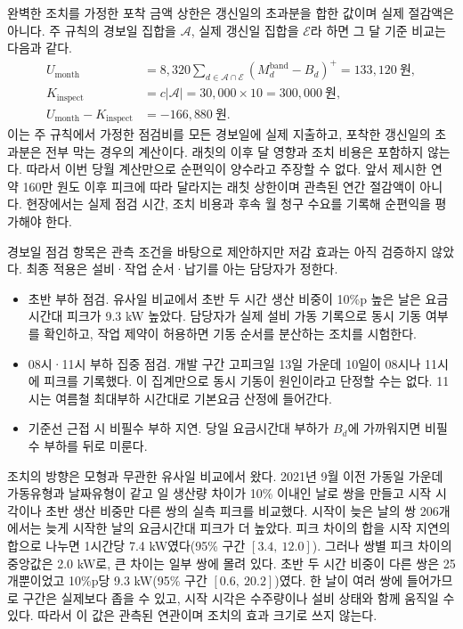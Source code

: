 완벽한 조치를 가정한 포착 금액 상한은 갱신일의 초과분을 합한 값이며 실제 절감액은 아니다. 주 규칙의 경보일 집합을 $\mathcal A$, 실제 갱신일 집합을 $\mathcal E$라 하면 그 달 기준 비교는 다음과 같다.
\begin{align}
U_{\mathrm{month}} &= 8{,}320\sum_{d\in\mathcal A\cap\mathcal E}
(M_d^{\mathrm{band}}-B_d)^+=133{,}120\ \text{원},\\
K_{\mathrm{inspect}} &= c|\mathcal A|=30{,}000\times10=300{,}000\ \text{원},\\
U_{\mathrm{month}}-K_{\mathrm{inspect}} &= -166{,}880\ \text{원}.
\label{eq:ch5-month-net-cap}
\end{align}
이는 주 규칙에서 가정한 점검비를 모든 경보일에 실제 지출하고, 포착한 갱신일의 초과분은 전부 막는 경우의 계산이다. 래칫의 이후 달 영향과 조치 비용은 포함하지 않는다. 따라서 이번 당월 계산만으로 순편익이 양수라고 주장할 수 없다. 앞서 제시한 연 약 160만 원도 이후 피크에 따라 달라지는 래칫 상한이며 관측된 연간 절감액이 아니다. 현장에서는 실제 점검 시간, 조치 비용과 후속 월 청구 수요를 기록해 순편익을 평가해야 한다.

경보일 점검 항목은 관측 조건을 바탕으로 제안하지만 저감 효과는 아직 검증하지 않았다. 최종 적용은 설비·작업 순서·납기를 아는 담당자가 정한다.
\begin{itemize}
\item 초반 부하 점검. 유사일 비교에서 초반 두 시간 생산 비중이 10\%p 높은 날은 요금시간대 피크가 9.3 kW 높았다. 담당자가 실제 설비 가동 기록으로 동시 기동 여부를 확인하고, 작업 제약이 허용하면 기동 순서를 분산하는 조치를 시험한다.
\item 08시·11시 부하 집중 점검. 개발 구간 고피크일 13일 가운데 10일이 08시나 11시에 피크를 기록했다. 이 집계만으로 동시 기동이 원인이라고 단정할 수는 없다. 11시는 여름철 최대부하 시간대로 기본요금 산정에 들어간다.
\item 기준선 근접 시 비필수 부하 지연. 당일 요금시간대 부하가 $B_d$에 가까워지면 비필수 부하를 뒤로 미룬다.
\end{itemize}

조치의 방향은 모형과 무관한 유사일 비교에서 왔다. 2021년 9월 이전 가동일 가운데 가동유형과 날짜유형이 같고 일 생산량 차이가 10\% 이내인 날로 쌍을 만들고 시작 시각이나 초반 생산 비중만 다른 쌍의 실측 피크를 비교했다. 시작이 늦은 날의 쌍 206개에서는 늦게 시작한 날의 요금시간대 피크가 더 높았다. 피크 차이의 합을 시작 지연의 합으로 나누면 1시간당 7.4 kW였다(95\% 구간 $[3.4,\ 12.0]$). 그러나 쌍별 피크 차이의 중앙값은 2.0 kW로, 큰 차이는 일부 쌍에 몰려 있다. 초반 두 시간 비중이 다른 쌍은 25개뿐이었고 10\%p당 9.3 kW(95\% 구간 $[0.6,\ 20.2]$)였다. 한 날이 여러 쌍에 들어가므로 구간은 실제보다 좁을 수 있고, 시작 시각은 수주량이나 설비 상태와 함께 움직일 수 있다. 따라서 이 값은 관측된 연관이며 조치의 효과 크기로 쓰지 않는다.

